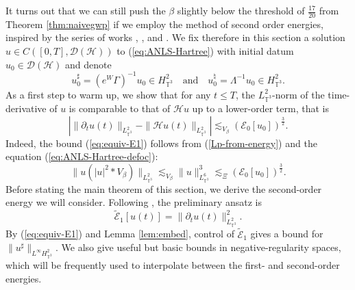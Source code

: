 It turns out that we can still push the $\beta$ slightly below the threshold
of $\frac{17}{20}$ from Theorem \ref{thm:naivegwp} if we employ the method of second
order energies, inspired by the series of works {\cite{PTV17}},
{\cite{TZ23a}}, {\cite{TV23b}} and {\cite{DLTV24}}. We fix therefore in this
section a solution $u \in C ([0, T], \mathcal{D} (\mathcal{H}))$ to
(\ref{eq:ANLS-Hartree}) with initial datum $u_0 \in \mathcal{D} (\mathcal{H})$
and denote
\[ u_0^{\sharp} = (e^W \Gamma)^{- 1} u_0 \in H_{\mathbb{T}^3}^2  \quad
   \text{and} \quad u_0^{\natural} = \Lambda^{- 1} u_0 \in H_{\mathbb{T}^3}^2
   . \]
As a first step to warm up, we show that for any $t \leqslant T$, the
$L_{\mathbb{T}^3}^2$-norm of the time-derivative of $u$ is comparable to that
of $\mathcal{H} u$ up to a lower-order term, that is
\begin{equation}
  \left| \| \partial_t u (t) \|_{L_{\mathbb{T}^3}^2} - \| \mathcal{H} u (t)
  \|_{L_{\mathbb{T}^3}^2} \right| \lesssim_{V_{\beta}} (\mathcal{E}_0
  [u_0])^{\frac{3}{2}} . \label{eq:equiv-E1}
\end{equation}
Indeed, the bound (\ref{eq:equiv-E1}) follows from (\ref{Lp-from-energy}) and
the equation (\ref{eq:ANLS-Hartree-defoc}):
\begin{equation}
  \| u (| u |^2 \ast V_{\beta}) \|_{L_{\mathbb{T}^3}^2} \lesssim_{V_{\beta}}
  \| u \|^3_{L_{\mathbb{T}^3}^6} \lesssim_{\Xi} (\mathcal{E}_0
  [u_0])^{\frac{3}{2}} . \label{rhs:energy}
\end{equation}
Before stating the main theorem of this section, we derive the
second-order energy we will consider. Following {\cite{PTV17}}, the
preliminary ansatz is
\begin{equation}
  \tilde{\mathcal{E}}_1 [u (t)] = \| \partial_t u (t)
  \|^2_{L_{\mathbb{T}^3}^2} . \label{eq:def-ho-energy}
\end{equation}
By (\ref{eq:equiv-E1}) and Lemma \ref{lem:embed}, control of
$\widetilde{\mathcal{E} }_1$ gives a bound for $\| u^{\sharp} \|_{L^{\infty}
H_{\mathbb{T}^3}^2}$. We also give useful but basic bounds in
negative-regularity spaces, which will be frequently used to interpolate
between the first- and second-order energies.

